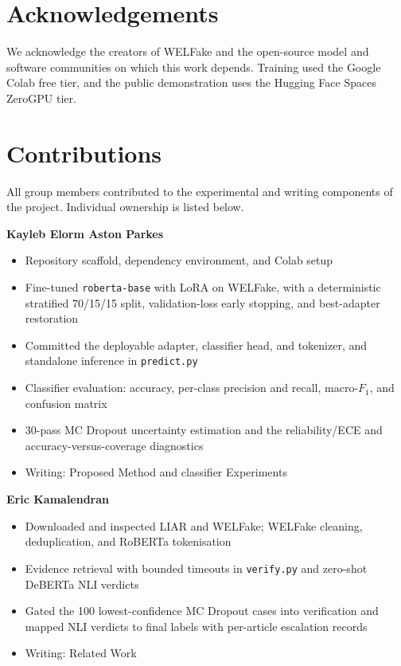 \documentclass[10pt,twocolumn,letterpaper]{article}
\begin{document}
\section{Acknowledgements}
We acknowledge the creators of WELFake and the open-source model and software
communities on which this work depends. Training used the Google Colab free tier,
and the public demonstration uses the Hugging Face Spaces ZeroGPU tier.

\section{Contributions}

All group members contributed to the experimental and writing
components of the project. Individual ownership is listed below.

\noindent\textbf{Kayleb Elorm Aston Parkes}
\begin{itemize}
  \item Repository scaffold, dependency environment, and Colab setup
  \item Fine-tuned \texttt{roberta-base} with LoRA on WELFake, with a
        deterministic stratified 70/15/15 split, validation-loss early
        stopping, and best-adapter restoration
  \item Committed the deployable adapter, classifier head, and
        tokenizer, and standalone inference in \texttt{predict.py}
  \item Classifier evaluation: accuracy, per-class precision and
        recall, macro-$F_1$, and confusion matrix
  \item 30-pass MC Dropout uncertainty estimation and the
        reliability/ECE and accuracy-versus-coverage diagnostics
  \item Writing: Proposed Method and classifier Experiments
\end{itemize}

\noindent\textbf{Eric Kamalendran}
\begin{itemize}
  \item Downloaded and inspected LIAR and WELFake; WELFake cleaning,
        deduplication, and RoBERTa tokenisation
  \item Evidence retrieval with bounded timeouts in \texttt{verify.py}
        and zero-shot DeBERTa NLI verdicts
  \item Gated the 100 lowest-confidence MC Dropout cases into
        verification and mapped NLI verdicts to final labels with
        per-article escalation records
  \item Writing: Related Work
\end{itemize}
\end{document}
